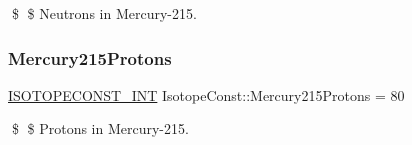 \$ \$ Neutrons in Mercury-\/215. \mbox{\label{group___isotope_const-_mercury-_hg215_gab507c5424106ce480b82c53998c8f0fb}} 
\subsubsection{\texorpdfstring{Mercury215\+Protons}{Mercury215Protons}}
{\footnotesize\ttfamily \mbox{\hyperlink{group___isotope_const-_macros_ga5f18360b3e99483a35c32d789e62621c}{I\+S\+O\+T\+O\+P\+E\+C\+O\+N\+S\+T\+\_\+\+I\+NT}} Isotope\+Const\+::\+Mercury215\+Protons = 80}

\$ \$ Protons in Mercury-\/215. 